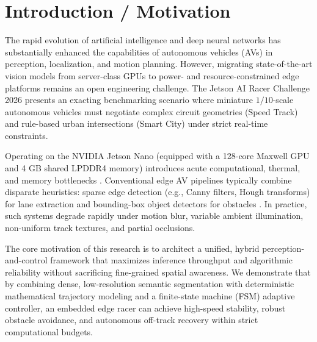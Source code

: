 \documentclass[conference]{IEEEtran}
\begin{document}
\section{Introduction / Motivation}
The rapid evolution of artificial intelligence and deep neural networks has substantially enhanced the capabilities of autonomous vehicles (AVs) in perception, localization, and motion planning. However, migrating state-of-the-art vision models from server-class GPUs to power- and resource-constrained edge platforms remains an open engineering challenge. The Jetson AI Racer Challenge 2026 presents an exacting benchmarking scenario where miniature $1/10$-scale autonomous vehicles must negotiate complex circuit geometries (Speed Track) and rule-based urban intersections (Smart City) under strict real-time constraints.

Operating on the NVIDIA Jetson Nano (equipped with a 128-core Maxwell GPU and 4 GB shared LPDDR4 memory) introduces acute computational, thermal, and memory bottlenecks \cite{ref1, ref2}. Conventional edge AV pipelines typically combine disparate heuristics: sparse edge detection (e.g., Canny filters, Hough transforms) for lane extraction and bounding-box object detectors for obstacles \cite{ref3}. In practice, such systems degrade rapidly under motion blur, variable ambient illumination, non-uniform track textures, and partial occlusions.

The core motivation of this research is to architect a unified, hybrid perception-and-control framework that maximizes inference throughput and algorithmic reliability without sacrificing fine-grained spatial awareness. We demonstrate that by combining dense, low-resolution semantic segmentation with deterministic mathematical trajectory modeling and a finite-state machine (FSM) adaptive controller, an embedded edge racer can achieve high-speed stability, robust obstacle avoidance, and autonomous off-track recovery within strict computational budgets.
\end{document}
